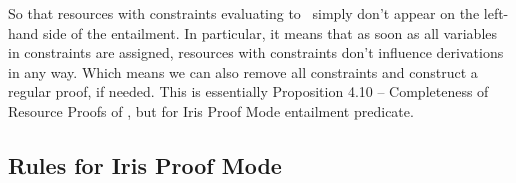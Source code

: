 So that resources with constraints evaluating to \false~simply don't appear on the left-hand side of the entailment.
In particular, it means that as soon as all variables in constraints are assigned, resources with \false constraints don't influence derivations in any way.
Which means we can also remove all constraints and construct a regular proof, if needed.
This is essentially Proposition 4.10 -- Completeness of Resource Proofs of \citet[page~25]{harlandResourceDistributionBooleanConstraints2003}, but for Iris Proof Mode entailment predicate.

\subsection{Rules for Iris Proof Mode}



